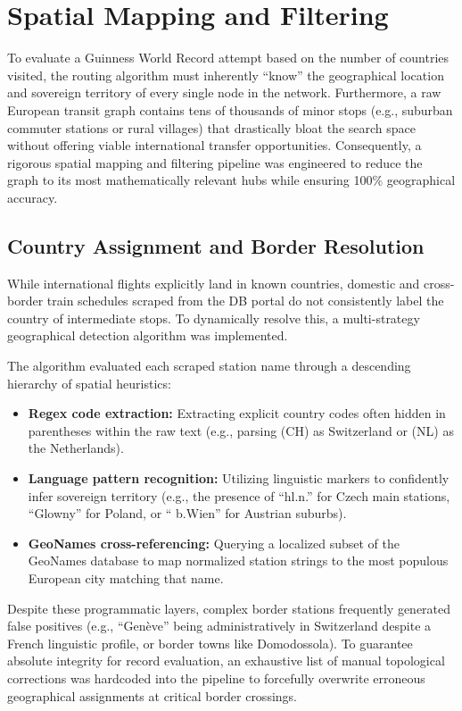 \section{Spatial Mapping and Filtering}
\label{sec:spatial_mapping}
To evaluate a Guinness World Record attempt based on the number of countries visited, the routing algorithm must inherently ``know'' the geographical location and sovereign territory of every single node in the network. Furthermore, a raw European transit graph contains tens of thousands of minor stops (e.g., suburban commuter stations or rural villages) that drastically bloat the search space without offering viable international transfer opportunities. Consequently, a rigorous spatial mapping and filtering pipeline was engineered to reduce the graph to its most mathematically relevant hubs while ensuring 100\% geographical accuracy.

\subsection{Country Assignment and Border Resolution}
\label{subsec:country_assignment_border_resolution}
While international flights explicitly land in known countries, domestic and cross-border train schedules scraped from the DB portal do not consistently label the country of intermediate stops. To dynamically resolve this, a multi-strategy geographical detection algorithm was implemented.

The algorithm evaluated each scraped station name through a descending hierarchy of spatial heuristics:

\begin{itemize}
  \item \textbf{Regex code extraction:} Extracting explicit country codes often hidden in parentheses within the raw text (e.g., parsing (CH) as Switzerland or (NL) as the Netherlands).
  \item \textbf{Language pattern recognition:} Utilizing linguistic markers to confidently infer sovereign territory (e.g., the presence of ``hl.n.'' for Czech main stations, ``Glowny'' for Poland, or `` b.Wien'' for Austrian suburbs).
  \item \textbf{GeoNames cross-referencing:} Querying a localized subset of the GeoNames database to map normalized station strings to the most populous European city matching that name.
\end{itemize}

Despite these programmatic layers, complex border stations frequently generated false positives (e.g., ``Gen\`eve'' being administratively in Switzerland despite a French linguistic profile, or border towns like Domodossola). To guarantee absolute integrity for record evaluation, an exhaustive list of manual topological corrections was hardcoded into the pipeline to forcefully overwrite erroneous geographical assignments at critical border crossings.

